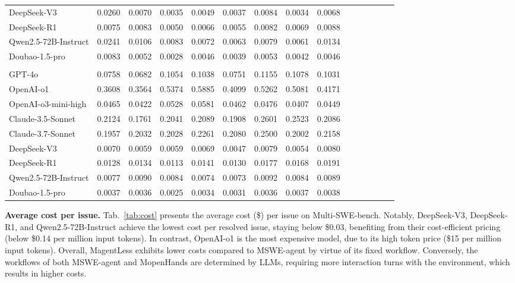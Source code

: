 \documentclass[11pt, a4paper, logo, copyright, nonumbering]{seed}
\newcommand{\multiswebench}{Multi-SWE-bench\xspace}
\newcommand{\magentless}{MagentLess\xspace}
\newcommand{\msweagent}{MSWE-agent\xspace}
\newcommand{\mopenhands}{MopenHands\xspace}
\begin{document}
\begin{table}[th]
{\begin{tabular}{lcccccccccccccc}
    DeepSeek-V3 & 0.0260 & 0.0070 & 0.0035 & 0.0049 & 0.0037 & 0.0084 & 0.0034 & 0.0068\\
    DeepSeek-R1 & 0.0075 & 0.0083 & 0.0050 & 0.0066 & 0.0055 & 0.0082 & 0.0069 & 0.0088\\
    Qwen2.5-72B-Instruct & 0.0241 & 0.0106 & 0.0083 & 0.0072 & 0.0063 & 0.0079 & 0.0061 & 0.0134\\
    Doubao-1.5-pro & 0.0083 & 0.0052 & 0.0028 & 0.0046 & 0.0039 & 0.0053 & 0.0042 & 0.0046\\
    \midrule
    \rowcolor{mygray}\multicolumn{9}{c}{\textbf{\mopenhands}} \\
    GPT-4o & 0.0758 & 0.0682 & 0.1054 & 0.1038 & 0.0751 & 0.1155 & 0.1078 & 0.1031\\
    OpenAI-o1 & 0.3608 & 0.3564 & 0.5374 & 0.5885 & 0.4099 & 0.5262 & 0.5081 & 0.4171\\
    OpenAI-o3-mini-high & 0.0465 & 0.0422 & 0.0528 & 0.0581 & 0.0462 & 0.0476 & 0.0407 & 0.0449\\
    Claude-3.5-Sonnet & 0.2124 & 0.1761 & 0.2041 & 0.2089 & 0.1908 & 0.2601 & 0.2523 & 0.2086\\
    Claude-3.7-Sonnet & 0.1957 & 0.2032 & 0.2028 & 0.2261 & 0.2080 & 0.2500 & 0.2002 & 0.2158\\
    DeepSeek-V3 & 0.0070 & 0.0059 & 0.0059 & 0.0069 & 0.0047 & 0.0079 & 0.0054 & 0.0080\\
    DeepSeek-R1 & 0.0128 & 0.0134 & 0.0113 & 0.0141 & 0.0130 & 0.0177 & 0.0168 & 0.0191\\
    Qwen2.5-72B-Instruct & 0.0077 & 0.0090 & 0.0084 & 0.0074 & 0.0073 & 0.0092 & 0.0084 & 0.0089\\
    Doubao-1.5-pro & 0.0037 & 0.0036 & 0.0025 & 0.0034 & 0.0031 & 0.0036 & 0.0037 & 0.0038\\
    \bottomrule
    \end{tabular}
}
\end{table}

\textbf{Average cost per issue.}
Tab.~\ref{tab:cost} presents the average cost (\$) per issue on \multiswebench.
Notably, DeepSeek-V3, DeepSeek-R1, and Qwen2.5-72B-Instruct achieve the lowest cost per resolved issue, staying below \$0.03, benefiting from their cost-efficient pricing (below \$0.14 per million input tokens).
In contrast, OpenAI-o1 is the most expensive model, due to its high token price (\$15 per million input tokens).
Overall, \magentless exhibits lower costs compared to \msweagent by virtue of its fixed workflow.
Conversely, the workflows of both \msweagent and \mopenhands are determined by LLMs, requiring more interaction turns with the environment, which results in higher costs.
\end{document}
